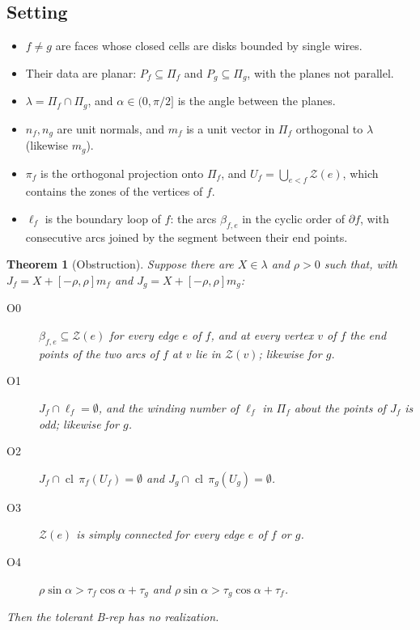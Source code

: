 \documentclass[preprint,12pt]{elsarticle}
\newtheorem{theorem}{Theorem}[section]
\theoremstyle{definition}
\theoremstyle{remark}
\newcommand{\Z}{\mathcal{Z}}
\newcommand{\cl}{\operatorname{cl}}
\begin{document}
\subsection{Setting}
\begin{itemize}
\item $f\ne g$ are faces whose closed cells are disks bounded by single wires.
\item Their data are planar: $P_f\subseteq\Pi_f$ and $P_g\subseteq\Pi_g$, with the planes not parallel.
\item $\lambda=\Pi_f\cap\Pi_g$, and $\alpha\in(0,\pi/2]$ is the angle between the planes.
\item $n_f,n_g$ are unit normals, and $m_f$ is a unit vector in $\Pi_f$ orthogonal to $\lambda$ (likewise $m_g$).
\item $\pi_f$ is the orthogonal projection onto $\Pi_f$, and $U_f=\bigcup_{e<f}\Z(e)$, which contains the zones
of the vertices of $f$.
\item $\ell_f$ is the boundary loop of $f$: the arcs $\beta_{f,e}$ in the cyclic order of $\partial f$, with
consecutive arcs joined by the segment between their end points.
\end{itemize}

\begin{theorem}[Obstruction]\label{thm:obstruction}
Suppose there are $X\in\lambda$ and $\rho>0$ such that, with $J_f=X+[-\rho,\rho]m_f$ and $J_g=X+[-\rho,\rho]m_g$:
\begin{description}
\item[O0] $\beta_{f,e}\subseteq\Z(e)$ for every edge $e$ of $f$, and at every vertex $v$ of $f$ the end points of
the two arcs of $f$ at $v$ lie in $\Z(v)$; likewise for $g$.
\item[O1] $J_f\cap\ell_f=\emptyset$, and the winding number of $\ell_f$ in $\Pi_f$ about the points of $J_f$ is
odd; likewise for $g$.
\item[O2] $J_f\cap\cl\,\pi_f(U_f)=\emptyset$ and $J_g\cap\cl\,\pi_g(U_g)=\emptyset$.
\item[O3] $\Z(e)$ is simply connected for every edge $e$ of $f$ or $g$.
\item[O4] $\rho\sin\alpha>\tau_f\cos\alpha+\tau_g$ and $\rho\sin\alpha>\tau_g\cos\alpha+\tau_f$.
\end{description}
Then the tolerant B-rep has no realization.
\end{theorem}
\end{document}
